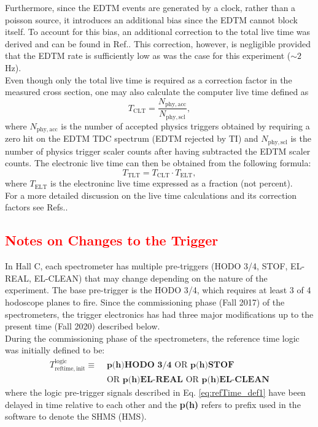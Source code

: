 \documentclass[11pt]{article}
\begin{document}
Furthermore, since the EDTM events are generated by a clock, rather than a poisson source, it introduces an additional bias since the EDTM cannot block itself. To account for this bias, an additional correction
to the total live time was derived and can be found in Ref.\cite{DMack_livetime_2019}. This correction, however, is negligible provided that the EDTM rate is sufficiently low as was the case for this experiment ($\sim 2$ Hz). \\
\indent Even though only the total live time is required as a correction factor in the measured cross section, one may also calculate the computer live time defined as
\begin{equation}
  T_{\mathrm{CLT}} = \frac{N_{\mathrm{phy,acc}}}{N_{\mathrm{phy,scl}}},
  \label{eq:3.25}
\end{equation}
where $N_{\mathrm{phy,acc}}$ is the number of accepted physics triggers obtained by requiring a zero hit on the EDTM TDC spectrum (EDTM rejected by TI) and $N_{\mathrm{phy,scl}}$ is the number of physics trigger scaler counts after
having subtracted the EDTM scaler counts. The electronic live time can then be obtained from the following formula:
\begin{equation}
  T_{\mathrm{TLT}} = T_{\mathrm{CLT}} \cdot T_{\mathrm{ELT}},
  \label{eq:3.26}
\end{equation}
where $T_{\mathrm{ELT}}$ is the electroninc live time expressed as a fraction (not percent). \\
\indent For a more detailed discussion on the live time calculations and its correction factors
see Refs.\cite{pooser_livetime_2019,DMack_livetime_2019}.
\newpage
\textcolor{red}{\section{Notes on Changes to the Trigger}}\label{sec:trg_ch}
\indent In Hall C, each spectrometer has multiple pre-triggers (HODO 3/4, STOF, EL-REAL, EL-CLEAN) that may change depending on the nature of the experiment.
The base pre-trigger is the HODO 3/4, which requires at least 3 of 4 hodoscope planes to fire. Since the commissioning phase (Fall 2017) of the spectrometers, the trigger
electronics has had three major modifications up to the present time (Fall 2020) described below.\\
\indent During the commissioning phase of the spectrometers, the reference time logic was initially defined to be:
\begin{align}
  T^{\mathrm{logic}}_{\mathrm{reftime,init}} \equiv &\textbf{ p(h)HODO 3/4} \text{ OR } \textbf{p(h)STOF} \nonumber  \\
  &\text{ OR } \textbf{p(h)EL-REAL} \text{ OR } \textbf{p(h)EL-CLEAN}
  \label{eq:refTime_def1}
\end{align}
where the logic pre-trigger signals described in Eq. \ref{eq:refTime_def1} have been delayed in time relative to each other and the \textbf{p(h)} refers to prefix used in the software to denote the SHMS (HMS).\\
\end{document}
